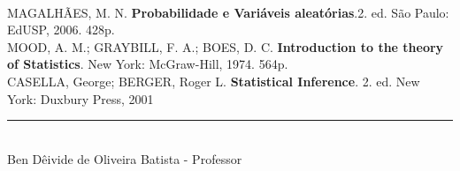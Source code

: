 \documentclass[landscape,a4paper]{article}
\begin{document}
	\\
	\noindent MAGALHÃES, M. N. {\bf Probabilidade e Variáveis aleatórias}.2. ed. São Paulo: EdUSP, 2006. 428p.\\
	MOOD, A. M.; GRAYBILL, F. A.; BOES, D. C. {\bf Introduction to the theory of Statistics}. New York: McGraw-Hill, 1974. 564p.\\
	CASELLA, George; BERGER, Roger L. { \bf Statistical Inference}. 2. ed. New York: Duxbury Press, 2001
	\vspace{1cm}
	\begin{center}
		\rule{10cm}{.1mm}\\
		Ben Dêivide de Oliveira Batista - Professor
	\end{center}
\end{document}
